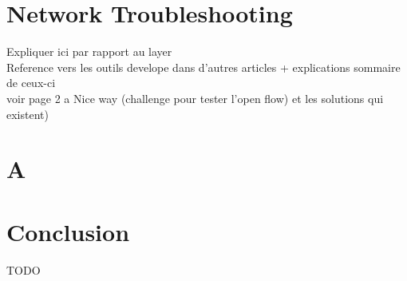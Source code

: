 \documentclass[10pt,article]{IEEEtran}
\begin{document}
\section{Network Troubleshooting}
Expliquer ici par rapport au layer\\
Reference vers les outils develope dans d'autres articles + explications sommaire de ceux-ci \\
voir page 2 a Nice way (challenge pour tester l'open flow) et les solutions qui existent)

\section{A}

\section{Conclusion}
TODO
\nocite{*}


\end{document}
